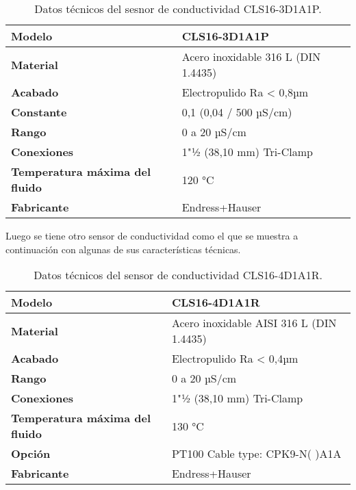 \renewcommand{\arraystretch}{2}
\begin{table}[H]
    \centering
    \caption{Datos técnicos del sesnor de conductividad CLS16-3D1A1P.}
    \label{table:sensorCLS16}
    \begin{tabular}{| L{6cm} | L{6cm} |}
        \hline
        \textbf{Modelo} & CLS16-3D1A1P  \\
        \hline
        \textbf{Material} & Acero inoxidable 316 L (DIN 1.4435)  \\
        \hline
        \textbf{Acabado} & Electropulido Ra < 0,8µm  \\
        \hline
        \textbf{Constante} & 0,1 (0,04 / 500 µS/cm)  \\
        \hline
        \textbf{Rango} & 0 a 20 µS/cm  \\
        \hline
        \textbf{Conexiones} & 1"½ (38,10 mm) Tri-Clamp  \\
        \hline
        \textbf{Temperatura máxima del fluido} & 120 °C  \\
        \hline
        \textbf{Fabricante} & Endress+Hauser  \\
        \hline
    \end{tabular}
\end{table}

Luego se tiene otro sensor de conductividad como el que se muestra a continuación con algunas de sus características técnicas.



\begin{table}[H]
    \centering
    \caption{Datos técnicos del sensor de conductividad CLS16-4D1A1R.}
    \label{table:sensorCLS164D1A1R}
    \begin{tabular}{| L{6cm} | L{6cm} |}
        \hline
        \textbf{Modelo} & CLS16-4D1A1R  \\
        \hline
        \textbf{Material} & Acero inoxidable AISI 316 L (DIN 1.4435)  \\
        \hline
        \textbf{Acabado} & Electropulido Ra < 0,4µm  \\
        \hline
        \textbf{Rango} & 0 a 20 µS/cm  \\
        \hline
        \textbf{Conexiones} & 1"½ (38,10 mm) Tri-Clamp  \\
        \hline
        \textbf{Temperatura máxima del fluido} & 130 °C  \\
        \hline
        \textbf{Opción} & PT100 Cable type: CPK9-N( )A1A  \\
        \hline
        \textbf{Fabricante} & Endress+Hauser  \\
        \hline
    \end{tabular}
\end{table}


